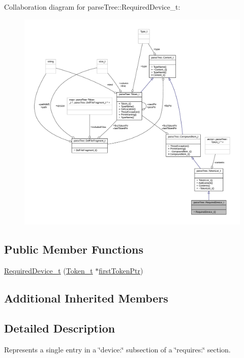 Collaboration diagram for parse\+Tree\+:\+:Required\+Device\+\_\+t\+:
\nopagebreak
\begin{figure}[H]
\begin{center}
\leavevmode
\includegraphics[width=350pt]{structparse_tree_1_1_required_device__t__coll__graph}
\end{center}
\end{figure}
\subsection*{Public Member Functions}
\begin{DoxyCompactItemize}
\item 
\hyperlink{structparse_tree_1_1_required_device__t_a798db6f491a8b6756ce2c19135bb6c99}{Required\+Device\+\_\+t} (\hyperlink{structparse_tree_1_1_token__t}{Token\+\_\+t} $\ast$\hyperlink{structparse_tree_1_1_compound_item__t_a587020c943e760cb0152dd8cd31e21ef}{first\+Token\+Ptr})
\end{DoxyCompactItemize}
\subsection*{Additional Inherited Members}


\subsection{Detailed Description}
Represents a single entry in a \char`\"{}device\+:\char`\"{} subsection of a \char`\"{}requires\+:\char`\"{} section. 

